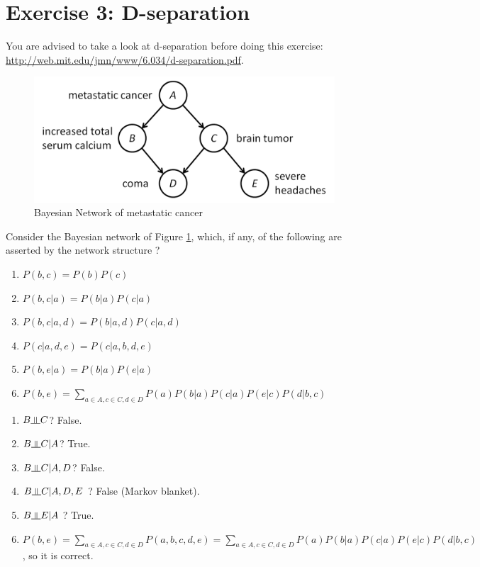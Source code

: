 \documentclass[9pt,a4paper]{extarticle}
\newenvironment{solution}
    {%
    \color{red}
    }
    { 
    \color{black}
    }
\newcommand{\indep}{\rotatebox[origin=c]{90}{$\models$}}
\begin{document}
\section*{Exercise 3: D-separation}
You are advised to take a look at d-separation before doing this exercise: \url{http://web.mit.edu/jmn/www/6.034/d-separation.pdf}.
\begin{figure}[H]
    \centering
    \includegraphics[width=1.\textwidth]{figures/pearl-bn-example.png}
    \caption{Bayesian Network of metastatic cancer}
    \label{fig:pearl-b-net}
\end{figure}
Consider the Bayesian network of Figure \ref{fig:pearl-b-net}, which, if any, of the following are asserted by the network structure ?
\begin{enumerate}
    \item $P(b, c) = P(b)P(c)$
    \item $P(b, c|a) = P(b|a)P(c|a)$
    \item $P(b, c| a, d) = P(b|a, d) P(c|a, d)$
    \item $P(c|a, d, e) = P(c|a, b, d, e)$
    \item $P(b, e|a) = P(b|a)P(e|a)$
    \item $P(b, e) = \sum_{a \in A, c \in C, d \in D} P(a) P(b|a) P(c|a) P(e|c) P(d|b, c)$
\end{enumerate}
\begin{solution}
\begin{enumerate}
    \item $B \indep C$? False.
    \item $B \indep C|A$? True.
    \item $B \indep C|A, D$? False.
    \item $B \indep C|A, D, E$ ? False (Markov blanket).
    \item $B \indep E | A$ ? True.
    \item $P(b, e) = \sum_{a \in A, c \in C, d \in D} P(a, b, c, d, e) = \sum_{a \in A, c \in C, d \in D} P(a) P(b|a) P(c|a) P(e|c) P(d|b, c) $, so it is correct.
\end{enumerate}
\end{solution}
\end{document}

